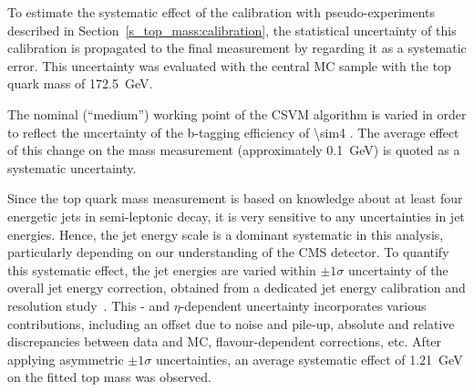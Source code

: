 \begin{description}[wide=\parindent]
\item [Fit calibration statistics.] To estimate the systematic effect of the calibration with pseudo-experiments
described in Section~\ref{s_top_mass:calibration}, the statistical uncertainty of this calibration is propagated to the
final measurement by regarding it as a systematic error. This uncertainty was evaluated with the central \ttbar MC
sample with the top quark mass of \SI{172.5}{\GeV}.

\item [b-tagging.] The nominal (``medium'') working point of the CSVM algorithm is varied in order to reflect the
uncertainty of the b-tagging efficiency of \SI{\sim4}{\pc} \autocite{b-tagging_CMS}. The average effect of this change
on the mass measurement (approximately \SI{0.1}{\GeV}) is quoted as a systematic uncertainty.

\item [Jet energy scale.] Since the top quark mass measurement is based on knowledge about at least four energetic jets
in semi-leptonic \ttbar decay, it is very sensitive to any uncertainties in jet energies. Hence, the jet energy scale is
a dominant systematic in this analysis, particularly depending on our understanding of the CMS detector. To quantify
this systematic effect, the jet energies are varied within $\pm1\sigma$ uncertainty of the overall jet energy
correction, obtained from a dedicated jet energy calibration and resolution study~\autocite{JEC_7TeV}. This \pt- and
$\eta$-dependent uncertainty incorporates various contributions, including an offset due to noise and pile-up, absolute
and relative discrepancies between data and MC, flavour-dependent corrections, etc. After applying asymmetric
$\pm1\sigma$ uncertainties, an average systematic effect of \SI{1.21}{\GeV} on the fitted top mass was observed.



\end{description}
